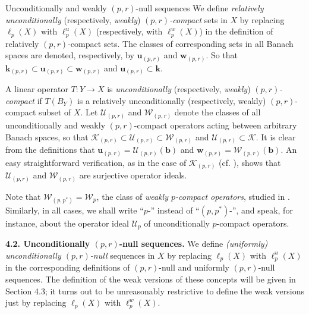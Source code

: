 \documentclass[a4paper,11pt]{amsart}
\theoremstyle{definition}
\theoremstyle{definition}
\theoremstyle{definition}
\begin{document}
\begin{section}{Unconditionally and weakly ${{(p,r)}}$-null sequences}
We define \emph{relatively unconditionally} (respectively, \emph{weakly}) \emph{${{(p,r)}}$-compact} sets in $X$ by replacing $\ell_p(X)$ with $\ell_p^u(X)$ (respectively, with $\ell_p^w (X)$) in the definition of relatively ${{(p,r)}}$-compact sets. The classes of corresponding sets in all Banach spaces are denoted, respectively, by ${\boldsymbol{u}}_{{(p,r)}}$ and ${\boldsymbol{w}} _{{(p,r)}}$. So that ${\boldsymbol{k}} _{{(p,r)}} \subset {\boldsymbol{u}} _{{(p,r)}} \subset {\boldsymbol{w}} _{{(p,r)}} $ and ${\boldsymbol{u}} _{{(p,r)}} \subset {\boldsymbol{k}}$. 

A linear operator $T: Y{\rightarrow} X$ is \emph{unconditionally} (respectively, \emph{weakly}) \emph{${{(p,r)}}$-compact} if $T(B_Y)$ is a relatively unconditionally (respectively, weakly) ${{(p,r)}}$-compact subset of $X$. Let ${{\mathcal U}}_{{(p,r)}}$ and ${{\mathcal W}}_{{(p,r)}}$ denote the classes of all unconditionally and weakly ${{(p,r)}}$-compact operators acting between arbitrary Banach spaces, so that ${{\mathcal K}}_{{(p,r)}} \subset {{\mathcal U}}_{{(p,r)}} \subset {{\mathcal W}}_{{(p,r)}}$ and ${{\mathcal U}}_{{(p,r)}} \subset {{\mathcal K}}$. It is clear from the definitions that ${\boldsymbol{u}}_{{(p,r)}} = {{\mathcal U}}_{{(p,r)}} ({\boldsymbol{b}})$ and ${\boldsymbol{w}}_{{(p,r)}} ={{\mathcal W}}_{{(p,r)}} ({\boldsymbol{b}})$. An easy straightforward verification, as in the case of ${{\mathcal K}}_{{(p,r)}}$ (cf. \cite[Propositions~2.1~and~2.2]{ALO}), shows that ${{\mathcal U}}_{{(p,r)}}$ and ${{\mathcal W}}_{{(p,r)}}$ are surjective operator ideals. 

Note that ${{\mathcal W}}_{(p,{p^{\ast}})} = {{\mathcal W}}_p$, the class of \emph{weakly $p$-compact operators}, studied in \cite{SK1}. Similarly, in all cases, we shall write ``$p$-'' instead of ``$(p,{p^{\ast}})$-'', and speak, for instance, about the operator ideal ${{\mathcal U}}_p$ of unconditionally $p$-compact operators.
 
\medskip

{\bf 4.2. Unconditionally ${{(p,r)}}$-null sequences.} We define \emph{(uniformly) unconditionally ${{(p,r)}}$-null} sequences in $X$ by replacing $\ell_p(X)$ with $\ell_p^u(X)$ in the corresponding definitions of ${{(p,r)}}$-null and uniformly ${{(p,r)}}$-null sequences. The definition of the weak versions of these concepts will be given in Section 4.3;  it turns out to be unreasonably restrictive to define the weak versions just by replacing $\ell_p(X)$ with $\ell_p^w(X)$.


\end{section}
\end{document}
